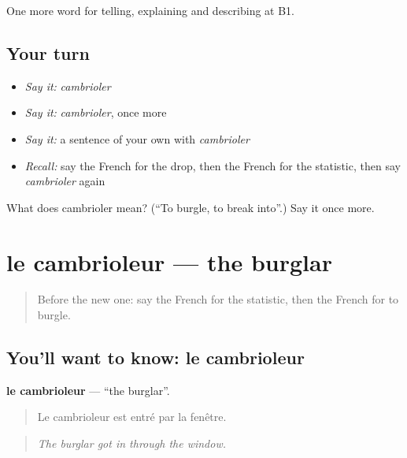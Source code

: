 \begin{grammarlens}[title={What you've built}]
One more word for telling, explaining and describing at B1.
\end{grammarlens}

\subsection*{Your turn}
\begin{itemize}
\raggedright
  \item \emph{Say it:} \emph{cambrioler}
  \item \emph{Say it:} \emph{cambrioler}, once more
  \item \emph{Say it:} a sentence of your own with \emph{cambrioler}
  \item \emph{Recall:} say the French for the drop, then the French for the statistic, then say \emph{cambrioler} again
\end{itemize}

\begin{tcolorbox}[breakable,colback=teal!4,colframe=teal!35!black,title={Before you move on}]
What does cambrioler mean? (\textquotedblleft{}To burgle, to break into\textquotedblright{}.) Say it once more.
\end{tcolorbox}
\section[le cambrioleur]{le cambrioleur — the burglar}

\label{lesson:FR-C287-cambrioleur}



\begin{quote}
Before the new one: say the French for the statistic, then the French for to burgle.
\end{quote}

\subsection*{You'll want to know: le cambrioleur}
\textbf{le cambrioleur} — \textquotedblleft{}the burglar\textquotedblright{}.

\begin{quote}
Le cambrioleur est entré par la fenêtre.
\end{quote}

\begin{quote}
\emph{The burglar got in through the window.}
\end{quote}

